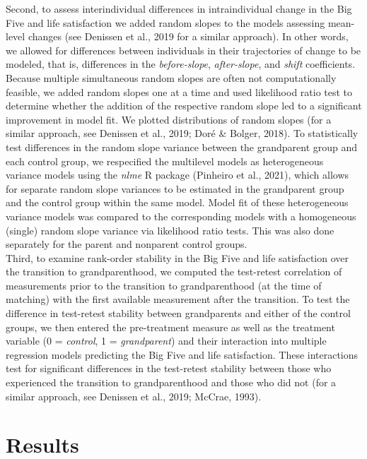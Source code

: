 \documentclass[
  english,
  man, noextraspace]{apa7}
\begin{document}
Second, to assess interindividual differences in intraindividual change in the Big Five and life satisfaction we added random slopes to the models assessing mean-level changes (see Denissen et al., 2019 for a similar approach). In other words, we allowed for differences between individuals in their trajectories of change to be modeled, that is, differences in the \emph{before-slope}, \emph{after-slope}, and \emph{shift} coefficients. Because multiple simultaneous random slopes are often not computationally feasible, we added random slopes one at a time and used likelihood ratio test to determine whether the addition of the respective random slope led to a significant improvement in model fit. We plotted distributions of random slopes (for a similar approach, see Denissen et al., 2019; Doré \& Bolger, 2018). To statistically test differences in the random slope variance between the grandparent group and each control group, we respecified the multilevel models as heterogeneous variance models using the \emph{nlme} R package (Pinheiro et al., 2021), which allows for separate random slope variances to be estimated in the grandparent group and the control group within the same model. Model fit of these heterogeneous variance models was compared to the corresponding models with a homogeneous (single) random slope variance via likelihood ratio tests. This was also done separately for the parent and nonparent control groups.\\
Third, to examine rank-order stability in the Big Five and life satisfaction over the transition to grandparenthood, we computed the test-retest correlation of measurements prior to the transition to grandparenthood (at the time of matching) with the first available measurement after the transition. To test the difference in test-retest stability between grandparents and either of the control groups, we then entered the pre-treatment measure as well as the treatment variable (0 = \emph{control}, 1 = \emph{grandparent}) and their interaction into multiple regression models predicting the Big Five and life satisfaction. These interactions test for significant differences in the test-retest stability between those who experienced the transition to grandparenthood and those who did not (for a similar approach, see Denissen et al., 2019; McCrae, 1993).

\hypertarget{results}{%
\section{Results}\label{results}}
\end{document}
